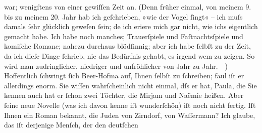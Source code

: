 \begin{ledgroupsized}[t]{13cm}
                    war; wenigſtens von einer gewiſſen Zeit an. (Denn früher einmal, von meinem 9.
                    bis zu meinem 20. Jahr hab ich geſchrieben, »wie der Vogel ſingt« – ich muſs
                    damals ſehr glücklich geweſen ſein; de{\geminationn} ich eri{\geminationn}ere mich gar nicht, wie ichs eigentlich gemacht
                    habe. Ich habe noch manches; Trauerſpiele und Faſtnachtsſpiele und {\pb}komiſche Romane; nahezu durchaus blödſinnig;
                    aber ich habe ſelbſt zu der Zeit, da ich dieſe Dinge ſchrieb, nie das Bedürfnis
                    gehabt, es irgend wem zu zeigen. So wird man zudringlicher, niedriger und
                    unfröhlicher von Jahr zu Jahr. –)\pend
           \pstart
           Hoffentlich ſchwingt ſich Beer-Hofma{\geminationn} auf, Ihnen ſelbſt zu ſchreiben; faul iſt er allerdings enorm. Sie wiſſen
                    wahrſcheinlich nicht einmal, dſs er \label{K_L00880_3v}\label{K_L00880_3h} hat, Paula, die Sie kennen {\pb}auch hat er
                    ſchon zwei Töchter, die Mirjam und Naëmie heißen. Aber ſeine neue Novelle (was ich davon kenne
                    iſt wunderſchön) iſt noch nicht fertig.\pend
           \pstart
           Iſt Ihnen ein Roman bekannt, die Juden von
                        Zirndorf, von Waſſermann? Ich
                    glaube, das iſt derjenige Menſch, der den \introOben{}deutſchen\introOben{}

\end{ledgroupsized}
